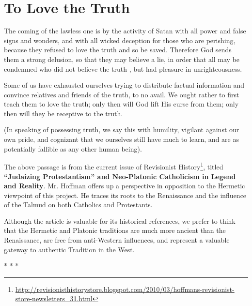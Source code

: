 \section{To Love the Truth}

\begin{quotex}
The coming of the lawless one is by the activity of Satan with all power and false signs and wonders, and with all wicked deception for those who are perishing, because they refused to love the truth and so be saved. Therefore God sends them a strong delusion, so that they may believe a lie, in order that all may be condemned who did not believe the truth , but had pleasure in unrighteousness.

Some of us have exhausted ourselves trying to distribute factual information and convince relatives and friends of the truth, to no avail. We ought rather to first teach them to love the truth; only then will God lift His curse from them; only then will they be receptive to the truth.

(In speaking of possessing truth, we say this with humility, vigilant against our own pride, and cognizant that we ourselves still have much to learn, and are as potentially fallible as any other human being).


\end{quotex}


The above passage is from the current issue of Revisionist History\footnote{\url{http://revisionisthistorystore.blogspot.com/2010/03/hoffmans-revisionist-store-newsletters\_31.html}}, titled \textbf{``Judaizing Protestantism'' and Neo-Platonic Catholicism in Legend and Reality}. Mr. Hoffman offers up a perspective in opposition to the Hermetic viewpoint of this project. He traces its roots to the Renaissance and the influence of the Talmud on both Catholics and Protestants.

Although the article is valuable for its historical references, we prefer to think that the Hermetic and Platonic traditions are much more ancient than the Renaissance, are free from anti-Western influences, and represent a valuable gateway to authentic Tradition in the West.



\begin{center}* * *\end{center}

